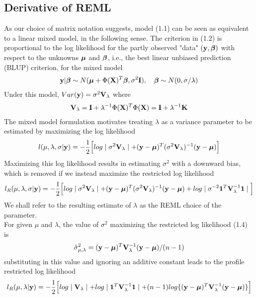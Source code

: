 \documentclass[11pt]{article}
\begin{document}
\subsection{\textbf{Derivative of REML}}
As our choice of matrix notation suggests, model (1.1) can be seen as equivalent to a linear mixed model, in the following sense. The criterion in (1.2) is proportional to the log likelihood for the partly observed "data" $({\bf y}, \boldsymbol{\beta})$ with respect to the unknowns $\boldsymbol{\mu}$ and $\boldsymbol{\beta}$, i.e., the best linear unbiased prediction (BLUP) criterion, for the mixed model
\begin{align*}
{\bf y}|\boldsymbol{\beta} \sim N(\boldsymbol{\mu}+\Phi({\bf X})^T \boldsymbol{\beta}, \sigma^2{\bf I}), \quad \boldsymbol{\beta} \sim N(0, \sigma/\lambda)
\end{align*}
Under this model, $Var({\bf y})=\sigma^2 {\bf V}_\lambda$ where
\begin{align}
{\bf V}_\lambda={\bf I}+\lambda^{-1}\Phi({\bf X})^T\Phi({\bf X})={\bf I}+\lambda^{-1}{\bf K}
\end{align}
The mixed model formulation motivates treating $\lambda$ as a variance parameter to be estimated by maximizing the log likelihood
\begin{align*}
l(\mu, \lambda, \sigma|{\bf y})=-\frac{1}{2}\Big[log\mid \sigma^2 {\bf V}_\lambda \mid +({\bf y}-\boldsymbol{\mu})^T(\sigma^2 {\bf V}_\lambda)^{-1}({\bf y}-\boldsymbol{\mu}) \Big]
\end{align*}
Maximizing this log likelihood results in estimating $\sigma^2$ with a downward bias, which is removed if we instead maximize the restricted log likelihood
\begin{align}
l_R(\mu, \lambda, \sigma|{\bf y})=-\frac{1}{2}\Big[log\mid \sigma^2 {\bf V}_\lambda \mid +({\bf y}-\boldsymbol{\mu})^T(\sigma^2 {\bf V}_\lambda)^{-1}({\bf y}-\boldsymbol{\mu})+log \mid \sigma^{-2}\mathbf{1}^T{\bf V}_\lambda^{-1}\mathbf{1} \mid \Big]
\end{align}
We shall refer to the resulting estimate of $\lambda$ as the REML choice of the parameter.\\
For given $\mu$ and $\lambda$, the value of $\sigma^2$ maximizing the restricted log likelihood (1.4) is
\begin{align}
\hat{\sigma}_{\mu, \lambda}^2=({\bf y}-\boldsymbol{\mu})^T{\bf V}_\lambda^{-1}({\bf y}-\boldsymbol{\mu})/(n-1)
\end{align}
substituting in this value and ignoring an additive constant leads to the profile restricted log likelihood
\begin{align}
l_R(\mu, \lambda|{\bf y})=-\frac{1}{2}\Big[log\mid {\bf V}_\lambda \mid +log \mid \mathbf{1}^T{\bf V}_\lambda^{-1}\mathbf{1} \mid+(n-1)log\{({\bf y}-\boldsymbol{\mu})^T {\bf V}_\lambda^{-1}({\bf y}-\boldsymbol{\mu})\}\Big]
\end{align}
\end{document}
